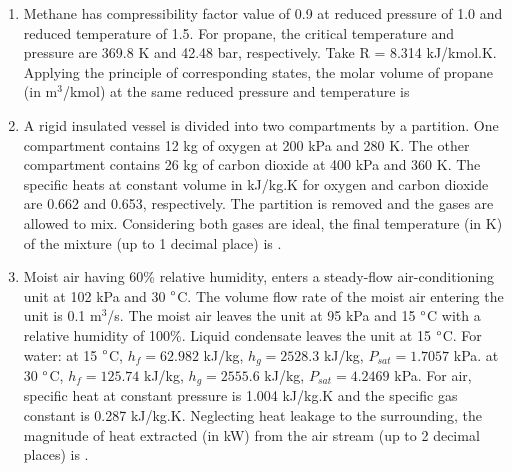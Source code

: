\documentclass[a4paper,10pt]{article}
\begin{document}
\begin{enumerate}
    \item Methane has compressibility factor value of 0.9 at reduced pressure of 1.0 and reduced temperature of 1.5. For propane, the critical temperature and pressure are 369.8 K and 42.48 bar, respectively. Take R = 8.314 kJ/kmol.K. Applying the principle of corresponding states, the molar volume of propane (in m$^3$/kmol) at the same reduced pressure and temperature is
    \hfill{}
    \begin{enumerate}[label=\Alph*)]
    \end{enumerate}

    \item A rigid insulated vessel is divided into two compartments by a partition. One compartment contains 12 kg of oxygen at 200 kPa and 280 K. The other compartment contains 26 kg of carbon dioxide at 400 kPa and 360 K. The specific heats at constant volume in kJ/kg.K for oxygen and carbon dioxide are 0.662 and 0.653, respectively. The partition is removed and the gases are allowed to mix. Considering both gases are ideal, the final temperature (in K) of the mixture (up to 1 decimal place) is \underline{\hspace{2cm}}.
    \hfill{}

    \item Moist air having 60\% relative humidity, enters a steady-flow air-conditioning unit at 102 kPa and 30 $\degree$C. The volume flow rate of the moist air entering the unit is 0.1 m$^3$/s. The moist air leaves the unit at 95 kPa and 15 $\degree$C with a relative humidity of 100\%. Liquid condensate leaves the unit at 15 $\degree$C.
    For water: at 15 $\degree$C, $h_f = 62.982$ kJ/kg, $h_g = 2528.3$ kJ/kg, $P_{sat} = 1.7057$ kPa.
    at 30 $\degree$C, $h_f = 125.74$ kJ/kg, $h_g = 2555.6$ kJ/kg, $P_{sat} = 4.2469$ kPa.
    For air, specific heat at constant pressure is 1.004 kJ/kg.K and the specific gas constant is 0.287 kJ/kg.K.
    Neglecting heat leakage to the surrounding, the magnitude of heat extracted (in kW) from the air stream (up to 2 decimal places) is \underline{\hspace{2cm}}.
    \hfill{}


\end{enumerate}
\end{document}
